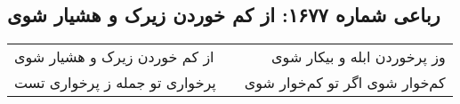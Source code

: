 \begin{center}
\section*{رباعی شماره ۱۶۷۷: از کم خوردن زیرک و هشیار شوی}
\label{sec:1677}
\begin{longtable}{l p{0.5cm} r}
از کم خوردن زیرک و هشیار شوی
&&
وز پرخوردن ابله و بیکار شوی
\\
پرخواری تو جمله ز پرخواری تست
&&
کم‌خوار شوی اگر تو کم‌خوار شوی
\\
\end{longtable}
\end{center}
